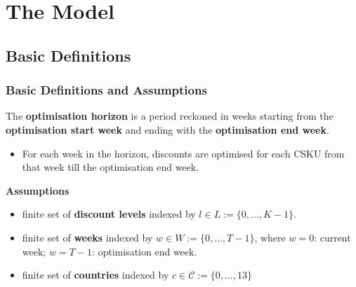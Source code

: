 \documentclass[xcolor=table]{beamer}
\begin{document}
\section{The Model}

\subsection{Basic Definitions}

\begin{frame}[t]
  \frametitle{Basic Definitions and Assumptions}
  \begin{definition}
  The \textcolor{orange2}{\textbf{optimisation horizon}} is a period reckoned in
  weeks starting from the \textcolor{orange2}{\textbf{optimisation start week}}
  and ending with the \textcolor{orange2}{\textbf{optimisation end week}}.
  \end{definition}
    \begin{itemize}
    \item For each week in the horizon, discounts are optimised for each CSKU from that
      week till the optimisation end week.
    \end{itemize}

\textbf{Assumptions}
    \begin{itemize}
      \item finite set of \textcolor{orange2}{\textbf{discount levels}} indexed
        by $l \in L := \{0, \ldots, K - 1\}$.
    \item finite set of \textcolor{orange2}{\textbf{weeks}} indexed by $w \in W
      := \{0 , \ldots, T - 1\}$,
      where $w = 0$: current week; $w = T - 1$: optimisation end week.
    \item finite set of \textcolor{orange2}{\textbf{countries}} indexed by $c
      \in \mathcal{C} := \{0, \ldots, 13\}$
  \end{itemize}
\end{frame}
\end{document}

